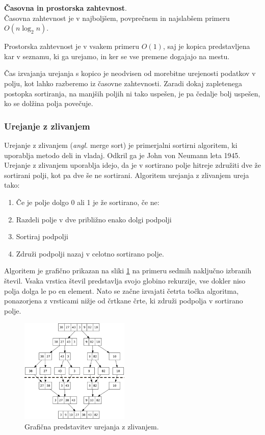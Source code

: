 \documentclass[a4paper,oneside]{article}
\begin{document}
\textbf{Časovna in prostorska zahtevnost}. \\
Časovna zahtevnost je v najboljšem, povprečnem in najslabšem primeru $O(n\log_2 n)$.

Prostorska zahtevnost je v vsakem primeru $O(1)$, saj je kopica predstavljena kar v
seznamu, ki ga urejamo, in ker se vse premene dogajajo na mestu.

Čas izvajanja urejanja s kopico je neodvisen od morebitne urejenosti podatkov v polju,
kot lahko razberemo iz časovne zahtevnosti. Zaradi dokaj zapletenega postopka sortiranja,
na manjših poljih ni tako uspešen, je pa čedalje bolj uspešen, ko se dolžina polja
povečuje.

\subsubsection{Urejanje z zlivanjem}
\label{chapter:mergesort}
Urejanje z zlivanjem (\emph{angl.} merge sort) je primerjalni sortirni algoritem, ki
uporablja metodo deli in vladaj. Odkril ga je John von Neumann leta 1945.
Urejanje z zlivanjem uporablja idejo, da je v sortirano polje hitreje združiti dve že
sortirani polji, kot pa dve še ne sortirani. 
Algoritem urejanja z zlivanjem ureja tako:
\begin{enumerate}
  \item Če je polje dolgo 0 ali 1 je že sortirano, če ne:
  \item Razdeli polje v dve približno enako dolgi podpolji
  \item Sortiraj podpolji 
  \item Združi podpolji nazaj v celotno sortirano polje.
\end{enumerate}

Algoritem je grafično prikazan na sliki \ref{fig:mergesortimage} na primeru sedmih
naključno izbranih števil.
Vsaka vrstica števil predstavlja svojo globino rekurzije, vse dokler niso polja dolga le
po en element. Nato se začne izvajati četrta točka algoritma, ponazorjena z vrsticami
nižje od črtkane črte, ki združi podpolja v sortirano polje.

\begin{figure}[h]
    \begin{center}
        \includegraphics[height=50mm]{slike/merge_sort.png}
    \end{center}
    \vspace{-0.7cm}
    \caption{Grafična predstavitev urejanja z zlivanjem.}
    \label{fig:mergesortimage}
\end{figure}
\end{document}
